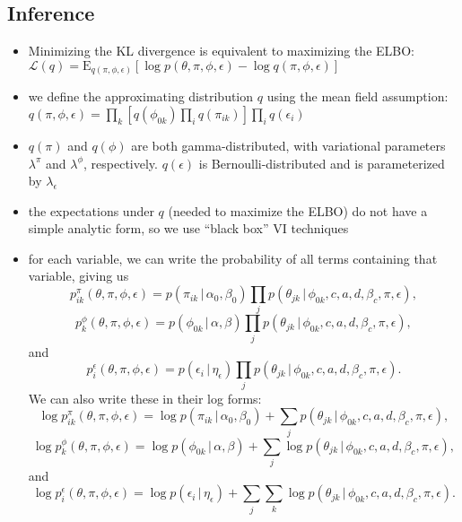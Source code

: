 \documentclass{article}
\newcommand{\E}{\mathrm{E}}
\newcommand{\g}{\, | \,}
\begin{document}
\subsection{Inference}
\begin{itemize}
\item Minimizing the KL divergence is equivalent to maximizing the ELBO: $\mathcal{L}(q)  = \E_{q(\pi, \phi, \epsilon)}[\log p(\theta,\pi,\phi,\epsilon) - \log q(\pi, \phi,\epsilon)]$
\item we define the approximating distribution $q$ using the mean field assumption: $q(\pi, \phi, \epsilon) = \prod_k\left[q(\phi_{0k})\prod_i q(\pi_{ik})\right]\prod_i q(\epsilon_i)$ 
\item $q(\pi)$ and $q(\phi)$ are both gamma-distributed, with variational parameters $\lambda^\pi$ and $\lambda^\phi$, respectively.  $q(\epsilon)$ is Bernoulli-distributed and is parameterized by $\lambda_\epsilon$
\item the expectations under $q$ (needed to maximize the ELBO) do not have a simple analytic form, so we use ``black box'' VI techniques
\item for each variable, we can write the probability of all terms containing that variable, giving us 
\[p^\pi_{ik}(\theta, \pi, \phi, \epsilon) = p(\pi_{ik} \g \alpha_0, \beta_0) \prod_j p(\theta_{jk} \g \phi_{0k}, c, a, d, \beta_c, \pi, \epsilon),\]
\[p^\phi_{k}(\theta, \pi, \phi, \epsilon) = p(\phi_{0k} \g \alpha, \beta) \prod_j p(\theta_{jk} \g \phi_{0k}, c, a, d, \beta_c, \pi, \epsilon),\]
and
\[p^\epsilon_i(\theta, \pi, \phi, \epsilon) = p(\epsilon_{i} \g \eta_\epsilon) \prod_j p(\theta_{jk} \g \phi_{0k}, c, a, d, \beta_c, \pi, \epsilon).\]
We can also write these in their log forms:
\[\log p^\pi_{ik}(\theta, \pi, \phi, \epsilon) = \log p(\pi_{ik} \g \alpha_0, \beta_0) + \sum_j p(\theta_{jk} \g \phi_{0k}, c, a, d, \beta_c, \pi, \epsilon),\]
\[\log p^\phi_{k}(\theta, \pi, \phi, \epsilon) = \log p(\phi_{0k} \g \alpha, \beta) + \sum_j \log p(\theta_{jk} \g \phi_{0k}, c, a, d, \beta_c, \pi, \epsilon),\]
and
\[\log p^\epsilon_{i}(\theta, \pi, \phi, \epsilon) = \log p(\epsilon_{i} \g \eta_\epsilon) + \sum_j\sum_k \log p(\theta_{jk} \g \phi_{0k}, c, a, d, \beta_c, \pi, \epsilon).\]

\end{itemize}
\end{document}

